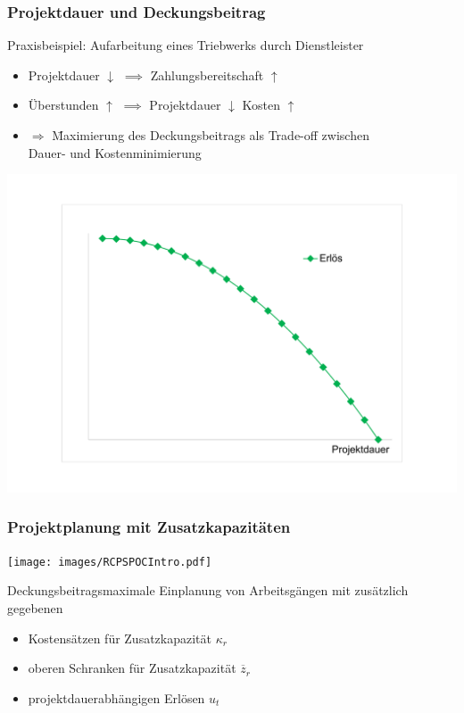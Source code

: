 \begin{frame}
\frametitle{Projektdauer und Deckungsbeitrag}
\begin{small}
Praxisbeispiel: Aufarbeitung eines Triebwerks durch Dienstleister
\begin{itemize}
\item Projektdauer {\large $\downarrow$} $\implies$ Zahlungsbereitschaft {\large $\uparrow$\\}
\item Überstunden {\large $\uparrow$} $\implies$ Projektdauer {\large $\downarrow$} Kosten {\large $\uparrow$}\\
\item[] \begin{tabbing}
$\Rightarrow$ \= Maximierung des Deckungsbeitrags als Trade-off zwischen\\
\>Dauer- und Kostenminimierung
\end{tabbing}

\end{itemize}
\end{small}
\begin{center}
\includegraphics[page=3,scale=0.29]{images/ErloesKostenDeckungsbeitrag.pdf}
\end{center}
\end{frame}


\begin{frame}[t]
	\frametitle{Projektplanung mit Zusatzkapazitäten}
	\begin{center}
		\texttt{[image: images/RCPSPOCIntro.pdf]}\\
	\end{center}
	
	{\small
		Deckungsbeitragsmaximale Einplanung von Arbeitsgängen mit zusätzlich gegebenen
		\begin{itemize}
			\itemsep0em
			\item Kostensätzen für Zusatzkapazität $\kappa_r$
			\item oberen Schranken für Zusatzkapazität $\overline{z}_r$
			\item projektdauerabhängigen Erlösen $u_t$
		\end{itemize}
	}
\end{frame}

